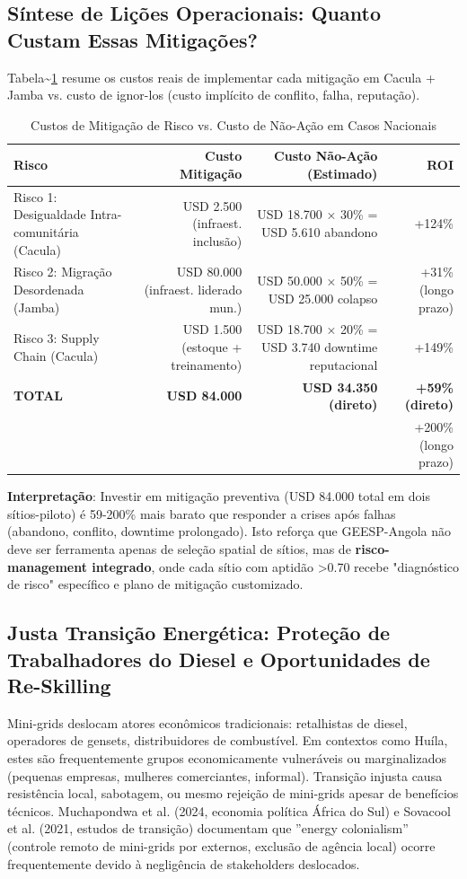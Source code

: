 \documentclass[12pt, a4paper]{article}
\begin{document}
\subsection{Síntese de Lições Operacionais: Quanto Custam Essas Mitigações?}

Tabela\textasciitilde{}\ref{tab:mitigation_costs} resume os custos reais de implementar cada mitigação em Cacula + Jamba vs. custo de ignor-los (custo implícito de conflito, falha, reputação).

\begin{table}[H]
\centering
\caption{Custos de Mitigação de Risco vs. Custo de Não-Ação em Casos Nacionais}
\label{tab:mitigation_costs}
\footnotesize
\begin{tabular}{lrrr}
\toprule
\rowcolor{LightBlue}\textbf{Risco} & \textbf{Custo Mitigação} & \textbf{Custo Não-Ação (Estimado)} & \textbf{ROI} \\
\midrule
Risco 1: Desigualdade Intra-comunitária (Cacula) & USD 2.500 (infraest. inclusão) & USD 18.700 × 30\% = USD 5.610 abandono & +124\% \\
Risco 2: Migração Desordenada (Jamba) & USD 80.000 (infraest. liderado mun.) & USD 50.000 × 50\% = USD 25.000 colapso & +31\% (longo prazo) \\
Risco 3: Supply Chain (Cacula) & USD 1.500 (estoque + treinamento) & USD 18.700 × 20\% = USD 3.740 downtime reputacional & +149\% \\
\midrule
\textbf{TOTAL} & \textbf{USD 84.000} & \textbf{USD 34.350 (direto)} & \textbf{+59\% (direto)} \\
&&  & +200\% (longo prazo) \\
\bottomrule
\end{tabular}
\end{table}
\textbf{Interpretação}: Investir em mitigação preventiva (USD 84.000 total em dois sítios-piloto) é 59-200\% mais barato que responder a crises após falhas (abandono, conflito, downtime prolongado). Isto reforça que GEESP-Angola não deve ser ferramenta apenas de seleção spatial de sítios, mas de
\textbf{risco-management integrado}, onde cada sítio com aptidão >0.70 recebe "diagnóstico de risco" específico e plano de mitigação customizado.

\subsection{Justa Transição Energética: Proteção de Trabalhadores do Diesel e Oportunidades de Re-Skilling}

Mini-grids deslocam atores econômicos tradicionais: retalhistas de diesel, operadores de gensets, distribuidores de combustível. Em contextos como Huíla, estes são frequentemente grupos economicamente vulneráveis ou marginalizados (pequenas empresas, mulheres comerciantes, informal). Transição injusta causa resistência local, sabotagem, ou mesmo rejeição de mini-grids apesar de benefícios técnicos. Muchapondwa et al. (2024, economia política África do Sul) e Sovacool et al. (2021, estudos de transição) documentam que ''energy colonialism'' (controle remoto de mini-grids por externos, exclusão de agência local) ocorre frequentemente devido à negligência de stakeholders deslocados.
\end{document}
